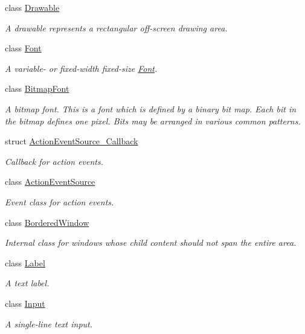 \begin{DoxyCompactItemize}
class \hyperlink{classGUI_1_1Drawable}{Drawable}
\begin{DoxyCompactList}\small\item\em A drawable represents a rectangular off-\/screen drawing area. \end{DoxyCompactList}\item 
class \hyperlink{classGUI_1_1Font}{Font}
\begin{DoxyCompactList}\small\item\em A variable-\/ or fixed-\/width fixed-\/size \hyperlink{classGUI_1_1Font}{Font}. \end{DoxyCompactList}\item 
class \hyperlink{classGUI_1_1BitmapFont}{Bitmap\-Font}
\begin{DoxyCompactList}\small\item\em A bitmap font. This is a font which is defined by a binary bit map. Each bit in the bitmap defines one pixel. Bits may be arranged in various common patterns. \end{DoxyCompactList}\item 
struct \hyperlink{structGUI_1_1ActionEventSource__Callback}{Action\-Event\-Source\-\_\-\-Callback}
\begin{DoxyCompactList}\small\item\em Callback for action events. \end{DoxyCompactList}\item 
class \hyperlink{classGUI_1_1ActionEventSource}{Action\-Event\-Source}
\begin{DoxyCompactList}\small\item\em Event class for action events. \end{DoxyCompactList}\item 
class \hyperlink{classGUI_1_1BorderedWindow}{Bordered\-Window}
\begin{DoxyCompactList}\small\item\em Internal class for windows whose child content should not span the entire area. \end{DoxyCompactList}\item 
class \hyperlink{classGUI_1_1Label}{Label}
\begin{DoxyCompactList}\small\item\em A text label. \end{DoxyCompactList}\item 
class \hyperlink{classGUI_1_1Input}{Input}
\begin{DoxyCompactList}\small\item\em A single-\/line text input. \end{DoxyCompactList}\item 

\end{DoxyCompactItemize}

